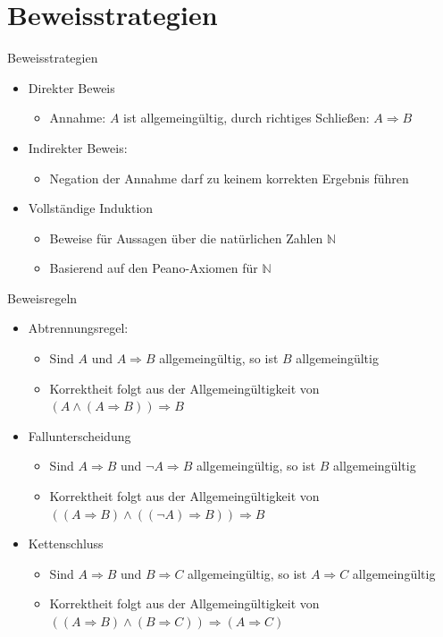\documentclass[12pt%
,aspectratio=169%
]{beamer}
\begin{document}
\section{Beweisstrategien}
\begin{frame}{Beweisstrategien}
\begin{itemize}
	\item Direkter Beweis
	\begin{itemize}
		\item Annahme: $A$ ist allgemeingültig, durch richtiges Schließen: $A \Rightarrow B$
	\end{itemize}
	\item Indirekter Beweis:
	\begin{itemize}
		\item Negation der Annahme darf zu keinem korrekten Ergebnis führen
	\end{itemize}
	\item Vollständige Induktion
	\begin{itemize}
		\item Beweise für Aussagen über die natürlichen Zahlen $\mathbb{N}$
		\item Basierend auf den Peano-Axiomen für $\mathbb{N}$
	\end{itemize}
\end{itemize}
\end{frame}

\begin{frame}{Beweisregeln}
\begin{itemize}
	\item Abtrennungsregel:
	\begin{itemize}
		\item Sind $A$ und $A \Rightarrow B$ allgemeingültig, so ist $B$ allgemeingültig
		\item Korrektheit folgt aus der Allgemeingültigkeit von $(A \land (A \Rightarrow B)) \Rightarrow B$
	\end{itemize}
	\item Fallunterscheidung
	\begin{itemize}
		\item Sind $A \Rightarrow B$ und $\neg A \Rightarrow B$ allgemeingültig, so ist $B$ allgemeingültig
		\item Korrektheit folgt aus der Allgemeingültigkeit von $((A \Rightarrow B) \land ((\neg A) \Rightarrow B)) \Rightarrow B$
	\end{itemize}
	\item Kettenschluss
	\begin{itemize}
		\item Sind $A \Rightarrow B$ und $B \Rightarrow C$ allgemeingültig, so ist $A \Rightarrow C$ allgemeingültig 
		\item Korrektheit folgt aus der Allgemeingültigkeit von $((A \Rightarrow B)\land (B \Rightarrow C)) \Rightarrow (A \Rightarrow C)$
	\end{itemize}
\end{itemize}
\end{frame}
\end{document}
